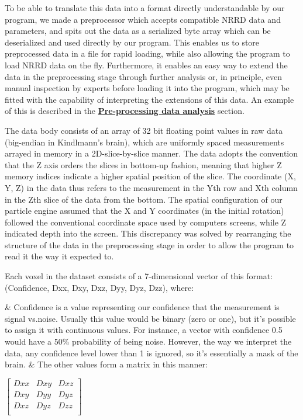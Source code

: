 \documentclass{article}
\newcommand{\secref}[2]{\hyperref[sec:#1]{\textbf{#2}}}
\begin{document}
To be able to translate this data into a format directly understandable by our program, we made a preprocessor which accepts compatible NRRD data and parameters, and spits out the data as a serialized byte array which can be deserialized and used directly by our program. This enables us to store preprocessed data in a file for rapid loading, while also allowing the program to load NRRD data on the fly. Furthermore, it enables an easy way to extend the data in the preprocessing stage through further analysis or, in principle, even manual inspection by experts before loading it into the program, which may be fitted with the capability of interpreting the extensions of this data. An example of this is described in the \secref{prepro}{Pre-processing data analysis} section.

The data body consists of an array of 32 bit floating point values in raw data (big-endian in Kindlmann's brain), which are uniformly spaced measurements arrayed in memory in a 2D-slice-by-slice manner. The data adopts the convention that the Z axis orders the slices in bottom-up fashion, meaning that higher Z memory indices indicate a higher spatial position of the slice. The coordinate (X, Y, Z) in the data thus refers to the measurement in the Yth row and Xth column in the Zth slice of the data from the bottom. The spatial configuration of our particle engine assumed that the X and Y coordinates (in the initial rotation) followed the conventional coordinate space used by computers screens, while Z indicated depth into the screen. This discrepancy was solved by rearranging the structure of the data in the preprocessing stage in order to allow the program to read it the way it expected to.

Each voxel in the dataset consists of a 7-dimensional vector of this format: (Confidence, Dxx, Dxy, Dxz, Dyy, Dyz, Dzz), where:
\begin{easylist}[itemize]
& Confidence is a value representing our confidence that the measurement is signal vs.\@ noise. Usually this value would be binary (zero or one), but it's possible to assign it with continuous values. For instance, a vector with confidence 0.5 would have a 50\% probability of being noise. However, the way we interpret the data, any confidence level lower than 1 is ignored, so it's essentially a mask of the brain.
& The other values form a matrix in this manner:
\end{easylist}

\hspace{1cm}
\(\begin{bmatrix}
    Dxx & Dxy & Dxz \\
    Dxy & Dyy & Dyz \\
    Dxz & Dyz & Dzz \\
\end{bmatrix}\)
\end{document}
